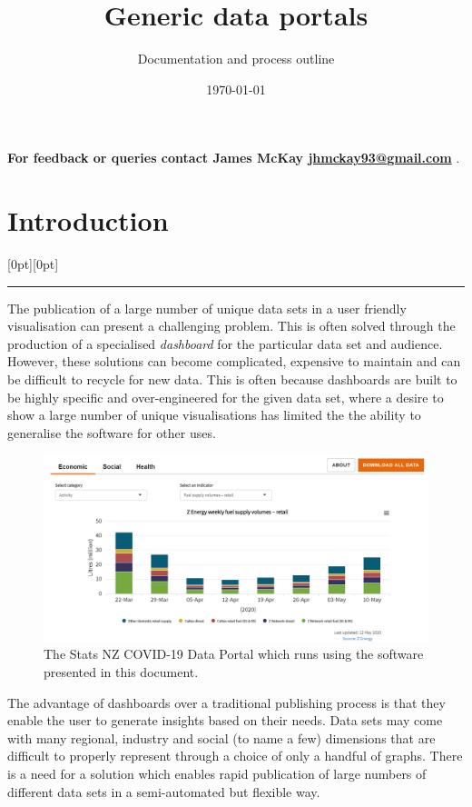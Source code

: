 \documentclass[12pt]{article}
\title{Generic data portals}
\author{Documentation and process outline}
\date{\today}
\newcommand\statssection[1]{%
  \section{{#1}}
  \raisebox{1.5em}[0pt][0pt]{\textcolor{statsorange}{\rule{0.2\textwidth}{6pt}}}
}
\begin{document}
\maketitle

\tableofcontents
\clearpage
\setcounter{page}{1}


{\center\vspace{0.25cm}}

{\center\textbf{For feedback or queries contact James McKay \href{mailto:jhmckay93@gmail.com}{jhmckay93@gmail.com} }.}

\vspace{0.4cm}

\statssection{Introduction}

The publication of a large number of unique data sets in a user friendly visualisation can present a challenging problem.  This is often solved through the production of a specialised \textit{dashboard} for the particular data set and audience.  However, these solutions can become complicated, expensive to maintain and can be difficult to recycle for new data.  This is often because dashboards are built to be highly specific and over-engineered for the given data set, where a desire to show a large number of unique visualisations has limited the the ability to generalise the software for other uses.
\vspace{0.5cm}

\begin{figure}[h]
\centering
\includegraphics[width=\textwidth]{figures/data_portal.png}
 	\caption{The Stats NZ COVID-19 Data Portal which runs using the software presented in this document.}\label{fig:covid_19_portal}
\end{figure}

The advantage of dashboards over a traditional publishing process is that they enable the user to generate insights based on their needs.  Data sets may come with many regional, industry and social (to name a few) dimensions that are difficult to properly represent through a choice of only a handful of graphs.  There is a need for a solution which enables rapid publication of large numbers of different data sets in a semi-automated but flexible way.
\end{document}
